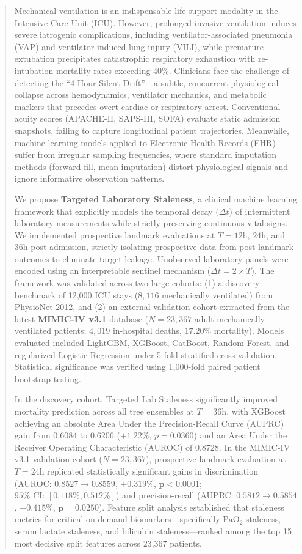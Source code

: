\documentclass[journal]{IEEEtran}
\begin{document}
\begin{abstract}
Mechanical ventilation is an indispensable life-support modality in the Intensive Care Unit (ICU). However, prolonged invasive ventilation induces severe iatrogenic complications, including ventilator-associated pneumonia (VAP) and ventilator-induced lung injury (VILI), while premature extubation precipitates catastrophic respiratory exhaustion with re-intubation mortality rates exceeding 40\%. Clinicians face the challenge of detecting the ``4-Hour Silent Drift''---a subtle, concurrent physiological collapse across hemodynamics, ventilator mechanics, and metabolic markers that precedes overt cardiac or respiratory arrest. Conventional acuity scores (APACHE-II, SAPS-III, SOFA) evaluate static admission snapshots, failing to capture longitudinal patient trajectories. Meanwhile, machine learning models applied to Electronic Health Records (EHR) suffer from irregular sampling frequencies, where standard imputation methods (forward-fill, mean imputation) distort physiological signals and ignore informative observation patterns.

We propose \textbf{Targeted Laboratory Staleness}, a clinical machine learning framework that explicitly models the temporal decay ($\Delta t$) of intermittent laboratory measurements while strictly preserving continuous vital signs. We implemented prospective landmark evaluations at $T = 12\text{h}$, $24\text{h}$, and $36\text{h}$ post-admission, strictly isolating prospective data from post-landmark outcomes to eliminate target leakage. Unobserved laboratory panels were encoded using an interpretable sentinel mechanism ($\Delta t = 2 \times T$). The framework was validated across two large cohorts: (1) a discovery benchmark of 12,000 ICU stays ($8,116$ mechanically ventilated) from PhysioNet 2012, and (2) an external validation cohort extracted from the latest \textbf{MIMIC-IV v3.1} database ($N = 23,367$ adult mechanically ventilated patients; $4,019$ in-hospital deaths, $17.20\%$ mortality). Models evaluated included LightGBM, XGBoost, CatBoost, Random Forest, and regularized Logistic Regression under 5-fold stratified cross-validation. Statistical significance was verified using 1,000-fold paired patient bootstrap testing.

In the discovery cohort, Targeted Lab Staleness significantly improved mortality prediction across all tree ensembles at $T = 36\text{h}$, with XGBoost achieving an absolute Area Under the Precision-Recall Curve (AUPRC) gain from $0.6084$ to $\mathbf{0.6206}$ ($+1.22\%$, $p = 0.0360$) and an Area Under the Receiver Operating Characteristic (AUROC) of $\mathbf{0.8728}$. In the MIMIC-IV v3.1 validation cohort ($N = 23,367$), prospective landmark evaluation at $T = 24\text{h}$ replicated statistically significant gains in discrimination (AUROC: $0.8527 \to \mathbf{0.8559}$, $+0.319\%$, $\mathbf{p < 0.0001}$; $95\%\text{ CI: } [0.118\%, 0.512\%]$) and precision-recall (AUPRC: $0.5812 \to \mathbf{0.5854}$, $+0.415\%$, $\mathbf{p = 0.0250}$). Feature split analysis established that staleness metrics for critical on-demand biomarkers---specifically $\text{PaO}_2$ staleness, serum lactate staleness, and bilirubin staleness---ranked among the top 15 most decisive split features across 23,367 patients.


\end{abstract}
\end{document}
